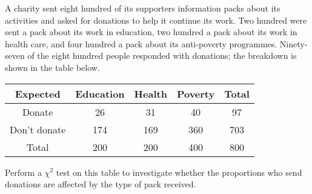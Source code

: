 \documentclass[a4paper,12pt]{article}
\begin{document}
A charity sent eight hundred of its supporters information packs about its activities and asked for donations to help it continue its work. Two hundred were sent a pack about its work in education, two hundred a pack about its
work in health care, and four hundred a pack about its anti-poverty programmes. Ninety-seven of the eight hundred people responded with donations; the breakdown is shown in the table below.



\begin{center}
\begin{tabular}{|c|c|c|c|c|}\hline
Expected 	&	Education 	&	Health 	&	Poverty 	&	Total	\\ \hline
Donate & 26 & 31 & 40 & 97 \\ \hline
Don’t donate  & 174 & 169& 360&  703\\ \hline
Total	&	200	&	200	&	400	&	800	\\ \hline
\end{tabular}
\end{center}

Perform a $\chi^2$ test on this table to investigate whether the proportions who
send donations are affected by the type of pack received. 
\end{document}
